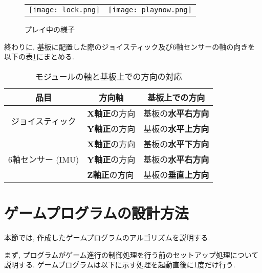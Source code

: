 \documentclass[10pt]{jsarticle}
\begin{document}
\begin{figure}[h]
	\begin{tabular}{cc}
	\begin{minipage}[t]{0.46\textwidth}
		\centering
		\texttt{[image: lock.png]}
		\caption{配線及びモジュールの固定}
 		\label{lock}
	\end{minipage} &
	\begin{minipage}[t]{0.545\textwidth}
		\centering
		\texttt{[image: playnow.png]}
		\caption{プレイ中の様子}
	 	\label{playnow}
	\end{minipage}
	\end{tabular}
\end{figure}

終わりに, 基板に配置した際のジョイスティック及び6軸センサーの軸の向きを以下の表\ref{direct}にまとめる.

\begin{table}[h]
 \caption{モジュールの軸と基板上での方向の対応}
 \label{direct}
 \centering
  \begin{tabular}{c l l}
  \multicolumn{1}{c}{品目}	&	\multicolumn{1}{c}{方向軸}	&	\multicolumn{1}{c}{基板上での方向}\\
   \hline \hline
   \multirow{2}{*}{ジョイスティック}	&	\textbf{X軸正}の方向		&	基板の\textbf{水平右方向}\\
   	&	\textbf{Y軸正}の方向		&	基板の\textbf{水平上方向}\\
   \hline
  \multirow{3}{*}{ 6軸センサー (IMU)}	&	\textbf{X軸正}の方向		&	基板の\textbf{水平下方向}\\
  	&	\textbf{Y軸正}の方向		&	基板の\textbf{水平右方向}\\	
  	&	\textbf{Z軸正}の方向		&	基板の\textbf{垂直上方向}\\	
   \hline
  \end{tabular}
\end{table}

\section{ゲームプログラムの設計方法}

本節では, 作成したゲームプログラムのアルゴリズムを説明する.

まず, プログラムがゲーム進行の制御処理を行う前のセットアップ処理について説明する.
ゲームプログラムは以下に示す処理を起動直後に1度だけ行う.
\end{document}

